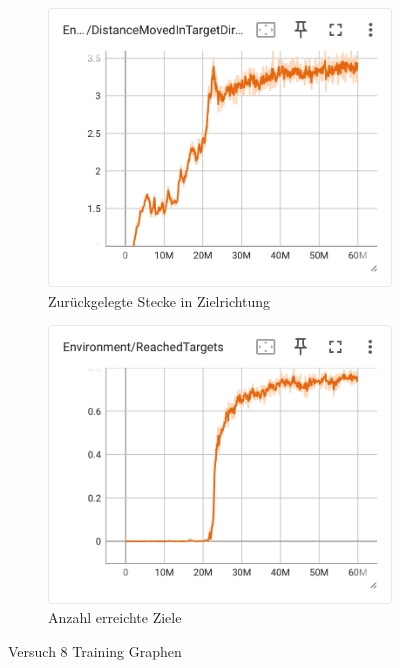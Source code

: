 \begin{figure}[H]
\begin{subfigure}{.49\textwidth}
      \label{fig:134_vel_reward}
    \end{subfigure}
    \begin{subfigure}{.49\textwidth}
      \centering  
      \includegraphics[width=\textwidth]{img/134_move_target_dir}
      \caption{Zurückgelegte Stecke in Zielrichtung}
      \label{fig:134_move_target_dir}
    \end{subfigure}
    \begin{subfigure}{.49\textwidth}
      \centering  
      \includegraphics[width=\textwidth]{img/134_reach_target}
      \caption{Anzahl erreichte Ziele}
      \label{fig:134_reach_target}
    \end{subfigure}
  \caption{Versuch 8 Training Graphen}
  \label{fig:versuch8_training}
\end{figure}

